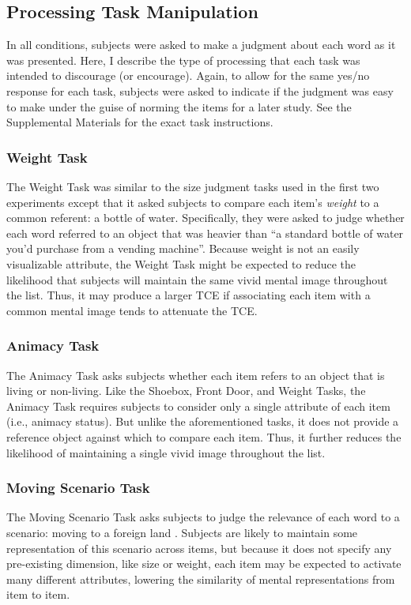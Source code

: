 \documentclass[man,natbib,floatsintext]{apa6} %
\begin{document}
\subsection{Processing Task Manipulation}
In all conditions, subjects were asked to make a judgment about each word as it was presented. Here, I describe the type of processing that each task was intended to discourage (or encourage). Again, to allow for the same yes/no response for each task, subjects were asked to indicate if the judgment was easy to make under the guise of norming the items for a later study. See the Supplemental Materials for the exact task instructions.

\subsubsection{Weight Task} The Weight Task was similar to the size judgment tasks used in the first two experiments except that it asked subjects to compare each item's \emph{weight} to a common referent: a bottle of water. Specifically, they were asked to judge whether each word referred to an object that was heavier than ``a standard bottle of water you'd purchase from a vending machine''. Because weight is not an easily visualizable attribute, the Weight Task might be expected to reduce the likelihood that subjects will maintain the same vivid mental image throughout the list. Thus, it may produce a larger TCE if associating each item with a common mental image tends to attenuate the TCE.

\subsubsection{Animacy Task} The Animacy Task asks subjects whether each item refers to an object that is living or non-living. Like the Shoebox, Front Door, and Weight Tasks, the Animacy Task requires subjects to consider only a single attribute of each item (i.e., animacy status). But unlike the aforementioned tasks, it does not provide a reference object against which to compare each item. Thus, it further reduces the likelihood of maintaining a single vivid image throughout the list.

\subsubsection{Moving Scenario Task} The Moving Scenario Task asks subjects to judge the relevance of each word to a scenario: moving to a foreign land \citep{NairEtal17}. Subjects are likely to maintain some representation of this scenario across items, but because it does not specify any pre-existing dimension, like size or weight, each item may be expected to activate many different attributes, lowering the similarity of mental representations from item to item.
\end{document}
